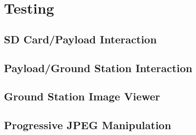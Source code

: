 \chapter{Testing}



\section{SD Card/Payload Interaction}

\section{Payload/Ground Station Interaction}

\section{Ground Station Image Viewer}

\section{Progressive JPEG Manipulation}

